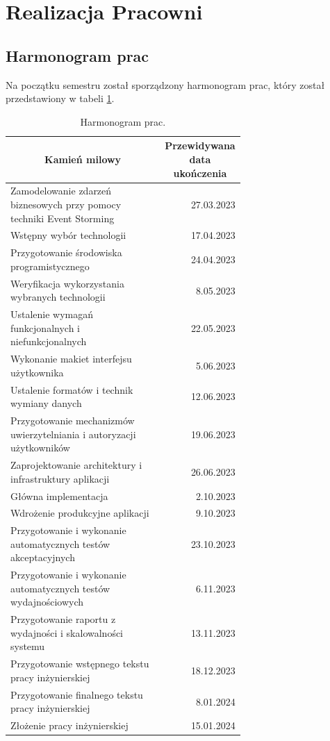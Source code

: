 \clearpage %
\section{Realizacja Pracowni}

\subsection{Harmonogram prac}

Na początku semestru został sporządzony harmonogram prac, który został przedstawiony w tabeli \ref{table:harmonogram}.

\begin{longtable}{| m{0.67\linewidth} | r |}
    \caption{Harmonogram prac.}
    \label{table:harmonogram} \\

    \hline
    \multicolumn{1}{|c|}{Kamień milowy} & \multicolumn{1}{c|}{Przewidywana data ukończenia} \\ \hline\hline \endfirsthead \endfoot
    \hline \endlastfoot

    Zamodelowanie zdarzeń biznesowych przy pomocy techniki Event Storming & 27.03.2023 \\ \hline
    Wstępny wybór technologii & 17.04.2023 \\ \hline
    Przygotowanie środowiska programistycznego & 24.04.2023 \\ \hline
    Weryfikacja wykorzystania wybranych technologii & 8.05.2023 \\ \hline
    Ustalenie wymagań funkcjonalnych i niefunkcjonalnych & 22.05.2023 \\ \hline
    Wykonanie makiet interfejsu użytkownika & 5.06.2023 \\ \hline
    Ustalenie formatów i technik wymiany danych & 12.06.2023 \\ \hline
    Przygotowanie mechanizmów uwierzytelniania i autoryzacji użytkowników & 19.06.2023 \\ \hline
    Zaprojektowanie architektury i infrastruktury aplikacji & 26.06.2023 \\ \hline
    Główna implementacja & 2.10.2023 \\ \hline
    Wdrożenie produkcyjne aplikacji & 9.10.2023 \\ \hline
    Przygotowanie i wykonanie automatycznych testów akceptacyjnych & 23.10.2023 \\ \hline
    Przygotowanie i wykonanie automatycznych testów wydajnościowych & 6.11.2023\\ \hline
    Przygotowanie raportu z wydajności i skalowalności systemu & 13.11.2023 \\ \hline
    Przygotowanie wstępnego tekstu pracy inżynierskiej & 18.12.2023 \\ \hline
    Przygotowanie finalnego tekstu pracy inżynierskiej & 8.01.2024 \\ \hline
    Złożenie pracy inżynierskiej & 15.01.2024 \\ \hline
\end{longtable}

